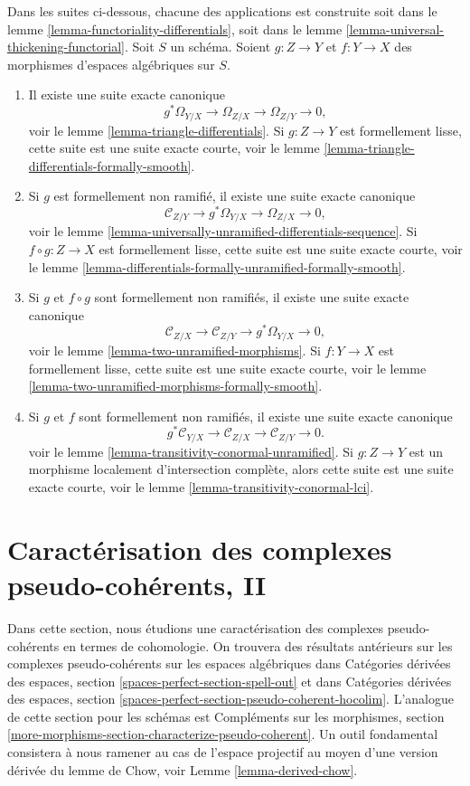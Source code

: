\medskip\noindent
Dans les suites ci-dessous, chacune des applications
est construite soit dans le
lemme \ref{lemma-functoriality-differentials}, soit dans le
lemme \ref{lemma-universal-thickening-functorial}.
Soit $S$ un schéma. Soient $g : Z \to Y$ et $f : Y \to X$ des morphismes
d'espaces algébriques sur $S$.
\begin{enumerate}
\item Il existe une suite exacte canonique
$$
g^*\Omega_{Y/X} \to \Omega_{Z/X} \to \Omega_{Z/Y} \to 0,
$$
voir le
lemme \ref{lemma-triangle-differentials}.
Si $g : Z \to Y$ est formellement lisse, cette suite est une suite
exacte courte, voir le
lemme \ref{lemma-triangle-differentials-formally-smooth}.
\item Si $g$ est formellement non ramifié, il existe une suite exacte canonique
$$
\mathcal{C}_{Z/Y} \to g^*\Omega_{Y/X} \to \Omega_{Z/X} \to 0,
$$
voir le
lemme \ref{lemma-universally-unramified-differentials-sequence}.
Si $f \circ g : Z \to X$ est formellement lisse, cette suite est une suite
exacte courte, voir le
lemme \ref{lemma-differentials-formally-unramified-formally-smooth}.
\item Si $g$ et $f \circ g$ sont formellement non ramifiés, il existe une
suite exacte canonique
$$
\mathcal{C}_{Z/X} \to \mathcal{C}_{Z/Y} \to g^*\Omega_{Y/X} \to 0,
$$
voir le
lemme \ref{lemma-two-unramified-morphisms}.
Si $f : Y \to X$ est formellement lisse, cette suite est une suite
exacte courte, voir le
lemme \ref{lemma-two-unramified-morphisms-formally-smooth}.
\item Si $g$ et $f$ sont formellement non ramifiés, il existe une suite
exacte canonique
$$
g^*\mathcal{C}_{Y/X} \to \mathcal{C}_{Z/X} \to \mathcal{C}_{Z/Y} \to 0.
$$
voir le
lemme \ref{lemma-transitivity-conormal-unramified}.
Si $g : Z \to Y$ est un morphisme localement d'intersection complète,
alors cette suite est une suite exacte courte, voir le
lemme \ref{lemma-transitivity-conormal-lci}.
\end{enumerate}










\section{Caractérisation des complexes pseudo-cohérents, II}
\label{section-characterize-pseudo-coherent}

\noindent
Dans cette section, nous étudions une caractérisation des complexes pseudo-cohérents
en termes de cohomologie. On trouvera des résultats antérieurs sur les complexes pseudo-cohérents
sur les espaces algébriques dans
Catégories dérivées des espaces, section
\ref{spaces-perfect-section-spell-out}
et dans
Catégories dérivées des espaces, section
\ref{spaces-perfect-section-pseudo-coherent-hocolim}.
L'analogue de cette section pour les schémas est Compléments sur les morphismes, section
\ref{more-morphisms-section-characterize-pseudo-coherent}.
Un outil fondamental consistera à nous ramener au cas de l'espace projectif
au moyen d'une version dérivée du lemme de Chow, voir
Lemme \ref{lemma-derived-chow}.

